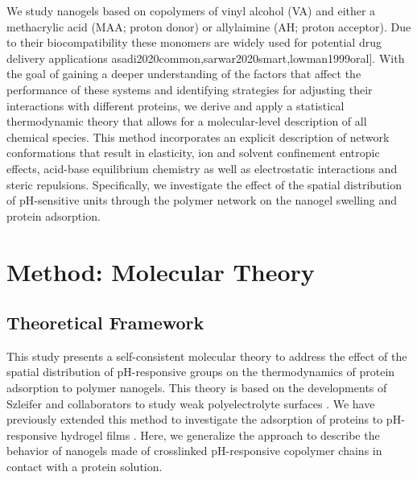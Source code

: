 We study nanogels based on copolymers of vinyl alcohol (VA) and either a methacrylic acid (MAA; proton donor) or allylaimine (AH; proton acceptor).
Due to their biocompatibility these monomers are widely used for potential drug delivery applications \addcite[]asadi2020common,sarwar2020smart,lowman1999oral].
With the goal of gaining a deeper understanding of the factors that affect the performance of these systems and identifying strategies for adjusting their interactions with different proteins, we derive and apply a statistical thermodynamic theory that allows for a molecular-level description of all chemical species.
This method incorporates an explicit description of network conformations that result in elasticity, ion and solvent confinement entropic effects, acid-base equilibrium chemistry as well as electrostatic interactions and steric repulsions.
Specifically, we investigate the effect of the spatial distribution of pH-sensitive units through the polymer network on the nanogel swelling and protein adsorption.















\section{Method: Molecular Theory}



\subsection{Theoretical Framework}\label{sect:theory}


 

This study presents a self-consistent molecular theory to address the effect of the spatial distribution of pH-responsive groups on the thermodynamics of  protein adsorption to polymer nanogels.
This theory is based on the developments of Szleifer and collaborators to study weak polyelectrolyte surfaces .
We have previously extended this method to investigate the adsorption of proteins to pH-responsive hydrogel films .
Here, we generalize the approach to describe the behavior of nanogels made of crosslinked pH-responsive copolymer chains in contact with a protein solution.
 


